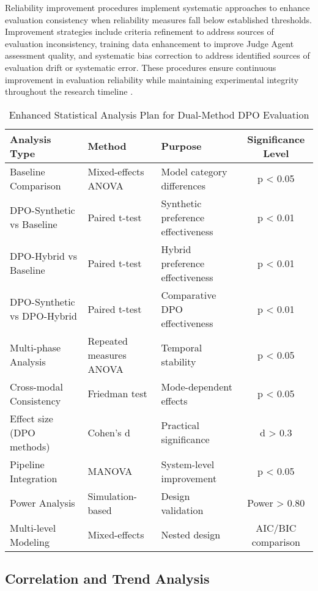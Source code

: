 Reliability improvement procedures implement systematic approaches to enhance evaluation consistency when reliability measures fall below established thresholds. Improvement strategies include criteria refinement to address sources of evaluation inconsistency, training data enhancement to improve Judge Agent assessment quality, and systematic bias correction to address identified sources of evaluation drift or systematic error. These procedures ensure continuous improvement in evaluation reliability while maintaining experimental integrity throughout the research timeline \cite{xu2024consistency_survey, chen2024meta_evaluation}.

\begin{table}[htbp]
    \centering
    \caption{Enhanced Statistical Analysis Plan for Dual-Method DPO Evaluation}
    \label{tab:statistical-analysis-plan}
    \begin{tabular}{|l|l|l|c|}
    \hline
    \textbf{Analysis Type} & \textbf{Method} & \textbf{Purpose} & \textbf{Significance Level} \\
    \hline
    Baseline Comparison & Mixed-effects ANOVA & Model category differences & p < 0.05 \\
    DPO-Synthetic vs Baseline & Paired t-test & Synthetic preference effectiveness & p < 0.01 \\
    DPO-Hybrid vs Baseline & Paired t-test & Hybrid preference effectiveness & p < 0.01 \\
    DPO-Synthetic vs DPO-Hybrid & Paired t-test & Comparative DPO effectiveness & p < 0.01 \\
    Multi-phase Analysis & Repeated measures ANOVA & Temporal stability & p < 0.05 \\
    Cross-modal Consistency & Friedman test & Mode-dependent effects & p < 0.05 \\
    Effect size (DPO methods) & Cohen's d & Practical significance & d > 0.3 \\
    Pipeline Integration & MANOVA & System-level improvement & p < 0.05 \\
    Power Analysis & Simulation-based & Design validation & Power > 0.80 \\
    Multi-level Modeling & Mixed-effects & Nested design & AIC/BIC comparison \\
    \hline
    \end{tabular}
\end{table}

\subsection{Correlation and Trend Analysis}

